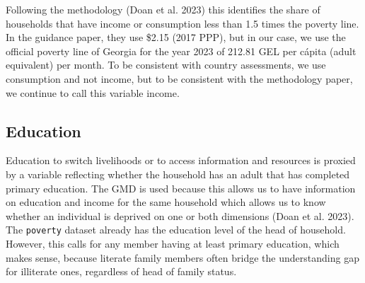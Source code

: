 \documentclass[
  letterpaper,
  DIV=11,
  numbers=noendperiod]{scrartcl}
\newenvironment{Shaded}{}{}
\newcommand{\AttributeTok}[1]{\textcolor[rgb]{0.84,0.23,0.29}{#1}}
\newcommand{\CommentTok}[1]{\textcolor[rgb]{0.42,0.45,0.49}{#1}}
\newcommand{\DecValTok}[1]{\textcolor[rgb]{0.00,0.36,0.77}{#1}}
\newcommand{\FloatTok}[1]{\textcolor[rgb]{0.00,0.36,0.77}{#1}}
\newcommand{\FunctionTok}[1]{\textcolor[rgb]{0.44,0.26,0.76}{#1}}
\newcommand{\NormalTok}[1]{\textcolor[rgb]{0.14,0.16,0.18}{#1}}
\newcommand{\OtherTok}[1]{\textcolor[rgb]{0.44,0.26,0.76}{#1}}
\newcommand{\SpecialCharTok}[1]{\textcolor[rgb]{0.00,0.36,0.77}{#1}}
\begin{document}
Following the methodology (Doan et al. 2023) this identifies the share
of households that have income or consumption less than 1.5 times the
poverty line. In the guidance paper, they use \$2.15 (2017 PPP), but in
our case, we use the official poverty line of Georgia for the year 2023
of 212.81 GEL per cápita (adult equivalent) per month. To be consistent
with country assessments, we use consumption and not income, but to be
consistent with the methodology paper, we continue to call this variable
income.

\begin{Shaded}
\end{Shaded}

\subsection{Education}\label{education}

Education to switch livelihoods or to access information and resources
is proxied by a variable reflecting whether the household has an adult
that has completed primary education. The GMD is used because this
allows us to have information on education and income for the same
household which allows us to know whether an individual is deprived on
one or both dimensions (Doan et al. 2023). The \texttt{poverty} dataset
already has the education level of the head of household. However, this
calls for any member having at least primary education, which makes
sense, because literate family members often bridge the understanding
gap for illiterate ones, regardless of head of family status.
\end{document}
